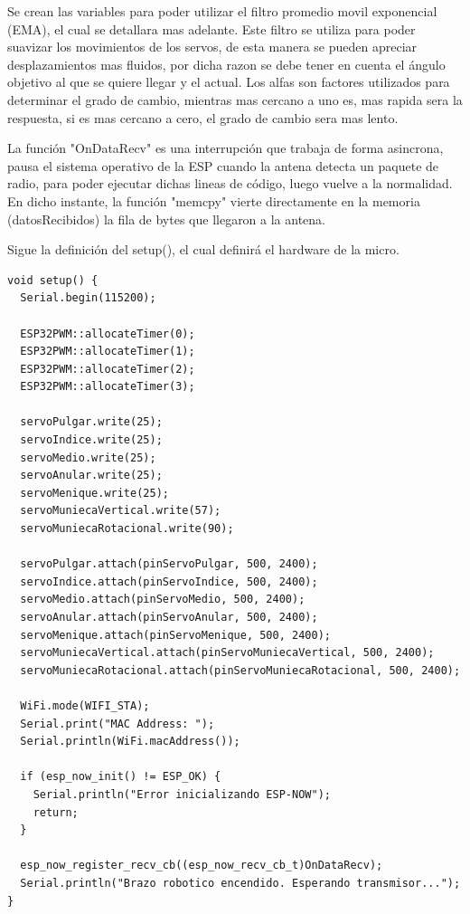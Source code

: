 \documentclass[10pt]{article}
\begin{document}
Se crean las variables para poder utilizar el filtro promedio movil exponencial (EMA), el cual se detallara mas adelante. Este filtro se utiliza para poder suavizar los movimientos de los servos, de esta manera se pueden apreciar desplazamientos mas fluidos, por dicha razon se debe tener en cuenta el ángulo objetivo al que se quiere llegar y el actual. Los alfas son factores utilizados para determinar el grado de cambio, mientras mas cercano a uno es, mas rapida sera la respuesta, si es mas cercano a cero, el grado de cambio sera mas lento.

La función "OnDataRecv" es una interrupción que trabaja de forma asincrona, pausa el sistema operativo de la ESP cuando la antena detecta un paquete de radio, para poder ejecutar dichas lineas de código, luego vuelve a la normalidad. En dicho instante, la función "memcpy" vierte directamente en la memoria (datosRecibidos) la fila de bytes que llegaron a la antena.  



Sigue la definición del setup(), el cual definirá el hardware de la micro.


\begin{lstlisting}
void setup() {
  Serial.begin(115200);
  
  ESP32PWM::allocateTimer(0);
  ESP32PWM::allocateTimer(1);
  ESP32PWM::allocateTimer(2);
  ESP32PWM::allocateTimer(3);

  servoPulgar.write(25);
  servoIndice.write(25);
  servoMedio.write(25);
  servoAnular.write(25);
  servoMenique.write(25);
  servoMuniecaVertical.write(57);
  servoMuniecaRotacional.write(90);

  servoPulgar.attach(pinServoPulgar, 500, 2400);
  servoIndice.attach(pinServoIndice, 500, 2400);
  servoMedio.attach(pinServoMedio, 500, 2400);
  servoAnular.attach(pinServoAnular, 500, 2400);
  servoMenique.attach(pinServoMenique, 500, 2400);
  servoMuniecaVertical.attach(pinServoMuniecaVertical, 500, 2400);
  servoMuniecaRotacional.attach(pinServoMuniecaRotacional, 500, 2400);
  
  WiFi.mode(WIFI_STA);
  Serial.print("MAC Address: ");
  Serial.println(WiFi.macAddress());

  if (esp_now_init() != ESP_OK) {
    Serial.println("Error inicializando ESP-NOW");
    return;
  }
  
  esp_now_register_recv_cb((esp_now_recv_cb_t)OnDataRecv);
  Serial.println("Brazo robotico encendido. Esperando transmisor...");
}
\end{lstlisting}
\end{document}
